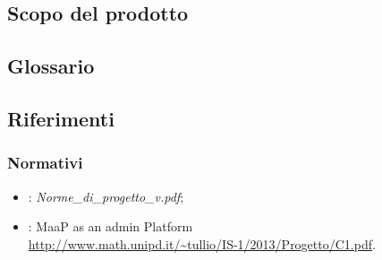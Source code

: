 \subsection{Scopo del prodotto}%
\label{1.2}
\Prodotto{}

\subsection{Glossario}%
\label{1.3}
\Glossario{}

\subsection{Riferimenti} %
\label{1.4}
\subsubsection{Normativi}
\label{1.4.1}
\begin{itemize}
\item {}: \emph{Norme\_di\_progetto\_v\versioneNormeDiProgetto{}.pdf};\\
\item {}: MaaP as an admin Platform\\
\url{http://www.math.unipd.it/~tullio/IS-1/2013/Progetto/C1.pdf}.
\end{itemize}
